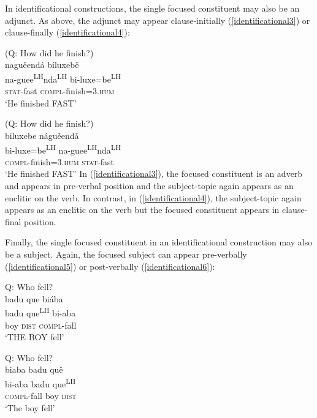 In identificational constructions, the single focused constituent may also be an adjunct. As above, the adjunct may appear clause-initially (\ref{identificational3}) or clause-finally (\ref{identificational4}):

\ea\label{identificational3} 
(Q: How did he finish?) \\
\glll nagu\v{e}end\'{a} b\'{i}luxeb\v{e}  \\
na-guee\textsuperscript{LH}nda\textsuperscript{LH} bi-luxe=be\textsuperscript{LH}  \\
\textsc{stat}-fast \textsc{compl}-finish=\textsc{3.hum}  \\
\glt `He finished FAST'
\z

\ea\label{identificational4} 
(Q: How did he finish?) \\
\glll biluxebe n\'{a}gu\v{e}end\v{a}  \\
bi-luxe=be\textsuperscript{LH} na-guee\textsuperscript{LH}nda\textsuperscript{LH}  \\
\textsc{compl}-finish=\textsc{3.hum} \textsc{stat}-fast   \\
\glt `He finished FAST'
\z
In (\ref{identificational3}), the focused constituent is an adverb and appears in pre-verbal position and the subject-topic again appears as an enclitic on the verb. In contrast, in (\ref{identificational4}), the subject-topic again appears as an enclitic on the verb but the focused constituent appears in clause-final position. 

Finally, the single focused constituent in an identificational construction may also be a subject. Again, the focused subject can appear pre-verbally (\ref{identificational5}) or post-verbally (\ref{identificational6}): 

\ea\label{identificational5} 
{Q: Who fell?} \\
\glll badu que bi\'{a}ba \\
badu que\textsuperscript{LH} bi-aba  \\
boy \textsc{dist} \textsc{compl}-fall   \\
\glt `THE BOY fell'
\z

\ea\label{identificational6}  
{Q: Who fell?} \\
\glll biaba badu qu\v{e}  \\
bi-aba badu que\textsuperscript{LH}  \\
\textsc{compl}-fall boy \textsc{dist}  \\
\glt `The boy fell'
\z

